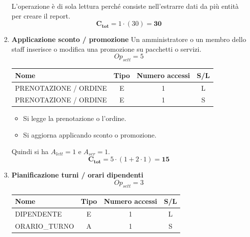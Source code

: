 \documentclass[a4paper,12pt]{report}
\begin{document}
\begin{enumerate}
    L'operazione è di sola lettura perché consiste nell'estrarre dati da più entità per creare il report. \\
    $$\mathbf{C_{tot}} = 1 \cdot (30) = \mathbf{30}$$
    
    
	\item {\large \textbf{Applicazione sconto / promozione}} \label{op17}
    Un amministratore o un membro dello staff inserisce o modifica una promozione su pacchetti o servizi.
    $$
    Op_{sett} = 5
    $$

    \begin{table}[H]
    \centering
    \small
    \renewcommand{\arraystretch}{1.15}
    \begin{tabularx}{0.8\textwidth}{|X|c|c|c|}
        \hline
        \rowcolor{gray!20}
        \textbf{Nome} & \textbf{Tipo} & \textbf{Numero accessi} & \textbf{S/L} \\
        \hline
        PRENOTAZIONE / ORDINE & E & 1 & L \\
        PRENOTAZIONE / ORDINE & E & 1 & S \\
        \hline
    \end{tabularx}
    \end{table}

    \begin{itemize}
      \item Si legge la prenotazione o l’ordine.
      \item Si aggiorna applicando sconto o promozione.
    \end{itemize}

    Quindi si ha $A_{lett}=1$ e $A_{scr}=1$. \\
    $$\mathbf{C_{tot}} = 5 \cdot (1 + 2 \cdot 1) = \mathbf{15}$$

	\item {\large \textbf{Pianificazione turni / orari dipendenti}} \label{op18}
    $$
    Op_{sett} = 3
    $$

    \begin{table}[H]
    \centering
    \small
    \renewcommand{\arraystretch}{1.15}
    \begin{tabularx}{0.8\textwidth}{|X|c|c|c|}
        \hline
        \rowcolor{gray!20}
        \textbf{Nome} & \textbf{Tipo} & \textbf{Numero accessi} & \textbf{S/L} \\
        \hline
        DIPENDENTE & E & 1 & L \\
        ORARIO\_TURNO & A & 1 & S \\
        \hline
    \end{tabularx}
    \end{table}


\end{enumerate}
\end{document}

